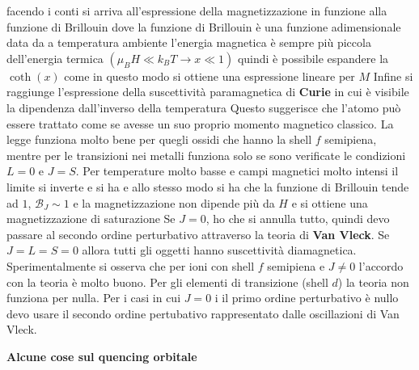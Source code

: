 \documentclass[a4paper,12pt]{article}
\begin{document}
facendo i conti si arriva all'espressione della magnetizzazione in funzione alla funzione di Brillouin
dove la funzione di Brillouin è una funzione adimensionale data da
a temperatura ambiente l'energia magnetica è sempre più piccola dell'energia termica $(\mu_B H \ll k_BT \to x\ll 1)$ quindi è possibile espandere la $\coth(x)$ come  
in questo modo si ottiene una espressione lineare per $M$
Infine si raggiunge l'espressione della suscettività paramagnetica di \textbf{Curie} in cui è visibile la dipendenza dall'inverso della temperatura
Questo suggerisce che l'atomo può essere trattato come se avesse un suo proprio momento magnetico classico. La legge funziona molto bene per quegli ossidi che hanno la shell $f$ semipiena, mentre per le transizioni nei metalli funziona solo se sono verificate le condizioni $L=0$ e $J=S$. Per temperature molto basse e campi magnetici molto intensi il limite si inverte e si ha
e allo stesso modo si ha che la funzione di Brillouin tende ad $1$, $\mathcal{B}_J \sim 1$ e la magnetizzazione non dipende più da $H$ e si ottiene una magnetizzazione di saturazione
Se $J=0$, ho che si annulla tutto, quindi devo passare al secondo ordine perturbativo attraverso la teoria di \textbf{Van Vleck}. Se $J=L=S=0$ allora tutti gli oggetti hanno suscettività diamagnetica. Sperimentalmente si osserva che per ioni con shell $f$ semipiena e $J\neq0$ l'accordo con la teoria è molto buono. Per gli elementi di transizione (shell $d$) la teoria non funziona per nulla. Per i casi in cui $J=0$ i il primo ordine perturbativo è nullo 
devo usare il secondo ordine pertubativo rappresentato dalle oscillazioni di Van Vleck.

\textbf{Alcune cose sul quencing orbitale}
\end{document}
